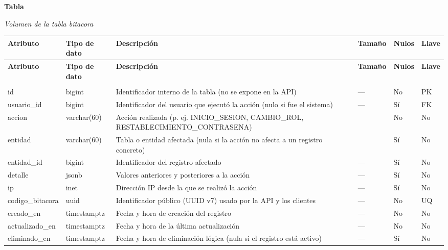 \label{tab:volumen_bitacora}
\noindent\textbf{Tabla~\thetable}\par\nopagebreak
\noindent\textit{Volumen de la tabla bitacora}\par\nopagebreak
\begingroup\small\linespread{1}\selectfont\setlength{\tabcolsep}{4pt}
\begin{longtable}{>{\raggedright\arraybackslash}p{3.4cm} >{\raggedright\arraybackslash}p{2.5cm} >{\raggedright\arraybackslash}p{4.8cm} >{\centering\arraybackslash}p{1.6cm}>{\centering\arraybackslash}p{1.1cm} >{\centering\arraybackslash}p{1.3cm}}
\toprule
\textbf{Atributo} & \textbf{Tipo de dato} & \textbf{Descripción} & \textbf{Tamaño} & \textbf{Nulos} & \textbf{Llave} \\
\midrule
\endfirsthead
\toprule
\textbf{Atributo} & \textbf{Tipo de dato} & \textbf{Descripción} & \textbf{Tamaño} & \textbf{Nulos} & \textbf{Llave} \\
\midrule
\endhead
\endfoot
\bottomrule
\multicolumn{6}{l}{\textit{Nota.} Elaboración propia.} \\
\endlastfoot
id & bigint & Identificador interno de la tabla (no se expone en la API) & — & No & PK \\
usuario\_\allowbreak{}id & bigint & Identificador del usuario que ejecutó la acción (nulo si fue el sistema) & — & Sí & FK \\
accion & varchar(60) & Acción realizada (p. ej. INICIO\_\allowbreak{}SESION, CAMBIO\_\allowbreak{}ROL, RESTABLECIMIENTO\_\allowbreak{}CONTRASENA) & 60 & No & No \\
entidad & varchar(60) & Tabla o entidad afectada (nula si la acción no afecta a un registro concreto) & 60 & Sí & No \\
entidad\_\allowbreak{}id & bigint & Identificador del registro afectado & — & Sí & No \\
detalle & jsonb & Valores anteriores y posteriores a la acción & — & Sí & No \\
ip & inet & Dirección IP desde la que se realizó la acción & — & Sí & No \\
codigo\_\allowbreak{}bitacora & uuid & Identificador público (UUID v7) usado por la API y los clientes & — & No & UQ \\
creado\_\allowbreak{}en & timestamptz & Fecha y hora de creación del registro & — & No & No \\
actualizado\_\allowbreak{}en & timestamptz & Fecha y hora de la última actualización & — & No & No \\
eliminado\_\allowbreak{}en & timestamptz & Fecha y hora de eliminación lógica (nula si el registro está activo) & — & Sí & No \\
\end{longtable}
\endgroup
\addtocounter{table}{-1}

